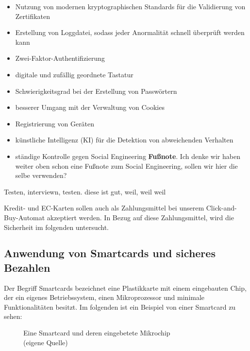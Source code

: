 \begin{itemize}
    \item Nutzung von modernen kryptographischen Standards für die Validierung von Zertifikaten
    \item Erstellung von Loggdatei, sodass jeder Anormalität schnell überprüft werden kann
    \item Zwei-Faktor-Authentifizierung
    \item digitale und zufällig geordnete Tastatur
    \item Schwierigkeitsgrad bei der Erstellung von Passwörtern
    \item besserer Umgang mit der Verwaltung von Cookies
    \item Registrierung von Geräten
    \item künstliche Intelligenz (KI) für die Detektion von abweichenden Verhalten
    \item ständige Kontrolle gegen Social Engineering \textbf{Fußnote}.
    Ich denke wir haben weiter oben schon eine Fußnote zum Social Engineering, sollen wir hier die selbe verwenden?
\end{itemize}


Testen, interviewn, testen. diese ist gut, weil, weil weil

Kredit- und EC-Karten sollen auch als Zahlungsmittel bei unserem Click-and-Buy-Automat
akzeptiert werden. In Bezug auf diese Zahlungsmittel, wird die Sicherheit im folgenden untersucht.


\subsection{Anwendung von Smartcards und sicheres Bezahlen}
Der Begriff Smartcards bezeichnet eine Plastikkarte mit einem eingebauten Chip, der ein eigenes 
Betriebssystem, einen Mikroprozessor und minimale Funktionalitäten besitzt. Im folgenden ist ein
Beispiel von einer Smartcard zu sehen: 

\vfill
\begin{figure}[H]
   \caption{Eine Smartcard und deren eingebetete Mikrochip\\(eigene Quelle)}
   \label{fig:eigenes_Bild}
\end{figure}
\vfill

